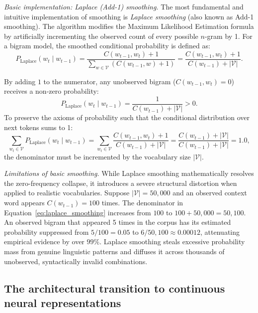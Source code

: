 \documentclass[../../main.tex]{subfiles}
\begin{document}
\textit{Basic implementation: Laplace (Add-1) smoothing.} The most fundamental and intuitive implementation of smoothing is \textit{Laplace smoothing} (also known as Add-1 smoothing). The algorithm modifies the Maximum Likelihood Estimation formula by artificially incrementing the observed count of every possible $n$-gram by 1. For a bigram model, the smoothed conditional probability is defined as:
\begin{equation}
P_{\text{Laplace}}\left(w_t \mid w_{t-1}\right) = \frac{C\left(w_{t-1}, w_t\right) + 1}{\sum_{w \in \mathcal{V}} \left(C(w_{t-1}, w) + 1\right)} = \frac{C\left(w_{t-1}, w_t\right) + 1}{C\left(w_{t-1}\right) + |\mathcal{V}|}.
\label{eq:laplace_smoothing}
\end{equation}

By adding $1$ to the numerator, any unobserved bigram ($C(w_{t-1}, w_t) = 0$) receives a non-zero probability:
\begin{equation}
P_{\text{Laplace}}\left(w_t \mid w_{t-1}\right) = \frac{1}{C(w_{t-1}) + |\mathcal{V}|} > 0.
\end{equation}
To preserve the axioms of probability such that the conditional distribution over next tokens sums to 1:
\begin{equation}
\sum_{w_t \in \mathcal{V}} P_{\text{Laplace}}\left(w_t \mid w_{t-1}\right) = \sum_{w_t \in \mathcal{V}} \frac{C\left(w_{t-1}, w_t\right) + 1}{C\left(w_{t-1}\right) + |\mathcal{V}|} = \frac{C(w_{t-1}) + |\mathcal{V}|}{C(w_{t-1}) + |\mathcal{V}|} = 1.0,
\end{equation}
the denominator must be incremented by the vocabulary size $|\mathcal{V}|$.

\textit{Limitations of basic smoothing.} While Laplace smoothing mathematically resolves the zero-frequency collapse, it introduces a severe structural distortion when applied to realistic vocabularies. Suppose $|\mathcal{V}| = 50{,}000$ and an observed context word appears $C(w_{t-1}) = 100$ times. The denominator in Equation~\eqref{eq:laplace_smoothing} increases from $100$ to $100 + 50{,}000 = 50{,}100$. An observed bigram that appeared 5 times in the corpus has its estimated probability suppressed from $5/100 = 0.05$ to $6/50{,}100 \approx 0.00012$, attenuating empirical evidence by over $99\%$. Laplace smoothing steals excessive probability mass from genuine linguistic patterns and diffuses it across thousands of unobserved, syntactically invalid combinations.

\subsection{The architectural transition to continuous neural representations}
\label{subsec:bridge_to_neural}
\end{document}
